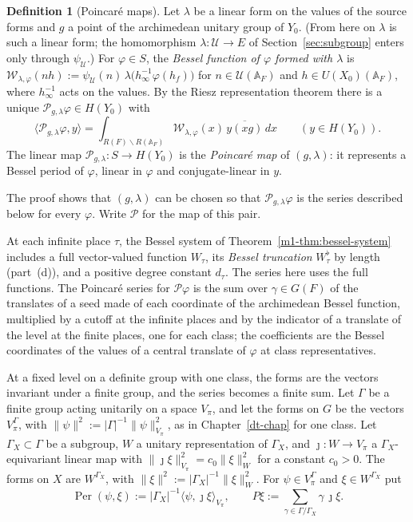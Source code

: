 \documentclass[reqno]{amsart}
\newcounter{chap}
\theoremstyle{definition}
\newtheorem{definition}{Definition}[section]
\theoremstyle{plain}
\theoremstyle{remark}
\newcommand{\A}{\mathbb A}
\newcommand{\Uc}{{\mathcal{U}}}
\newcommand{\Pc}{\mathcal P}
\newcommand{\Wc}{\mathcal W}
\newcommand{\Per}{\operatorname{Per}}
\begin{document}
\begin{definition}[Poincar\'e maps]\label{def:poincare}
Let \(\lambda\) be a linear form on the values of the source forms and \(g\) a point of the archimedean unitary group of \(Y_0\).  (From here on \(\lambda\) is such a linear form; the homomorphism \(\lambda\colon\Uc\to E\) of Section~\ref{sec:subgroup} enters only through \(\psi_{\Uc}\).)  For \(\varphi\in S\), the \emph{Bessel function of \(\varphi\) formed with \(\lambda\)} is \(\Wc_{\lambda,\varphi}(nh):=\psi_{\Uc}(n)\,\lambda\bigl(h_\infty^{-1}\varphi(h_f)\bigr)\) for \(n\in \Uc(\A_F)\) and \(h\in U(X_0)(\A_F)\), where \(h_\infty^{-1}\) acts on the values.  By the Riesz representation theorem there is a unique \(\Pc_{g,\lambda}\varphi\in H(Y_0)\) with
\[
 \langle \Pc_{g,\lambda}\varphi,y\rangle=\int_{R(F)\backslash R(\A_F)}\Wc_{\lambda,\varphi}(x)\,\overline{y(xg)}\,dx\qquad(y\in H(Y_0)).
\]
The linear map \(\Pc_{g,\lambda}\colon S\to H(Y_0)\) is the \emph{Poincar\'e map} of \((g,\lambda)\): it represents a Bessel period of \(\varphi\), linear in \(\varphi\) and conjugate-linear in \(y\).
\end{definition}

The proof shows that \((g,\lambda)\) can be chosen so that \(\Pc_{g,\lambda}\varphi\) is the series described below for every \(\varphi\).  Write \(\Pc\) for the map of this pair.

At each infinite place \(\tau\), the Bessel system of Theorem~\ref{m1-thm:bessel-system} includes a full vector-valued function \(W_\tau\), its \emph{Bessel truncation} \(W_\tau^\flat\) by length (part~(d)), and a positive degree constant \(d_\tau\).  The series here uses the full functions.  The Poincar\'e series for \(\Pc\varphi\) is the sum over \(\gamma\in G(F)\) of the translates of a seed made of each coordinate of the archimedean Bessel function, multiplied by a cutoff at the infinite places and by the indicator of a translate of the level at the finite places, one for each class; the coefficients are the Bessel coordinates of the values of a central translate of \(\varphi\) at class representatives.

At a fixed level on a definite group with one class, the forms are the vectors invariant under a finite group, and the series becomes a finite sum.  Let \(\Gamma\) be a finite group acting unitarily on a space \(V_\pi\), and let the forms on \(G\) be the vectors \(V_\pi^\Gamma\), with \(\lVert\psi\rVert^2:=\lvert\Gamma\rvert^{-1}\lVert\psi\rVert_{V_\pi}^2\), as in Chapter~\ref{dt-chap} for one class.  Let \(\Gamma_X\subset\Gamma\) be a subgroup, \(W\) a unitary representation of \(\Gamma_X\), and \(\jmath\colon W\to V_\pi\) a \(\Gamma_X\)-equivariant linear map with \(\lVert\jmath\xi\rVert_{V_\pi}^2=c_0\lVert\xi\rVert_W^2\) for a constant \(c_0>0\).  The forms on \(X\) are \(W^{\Gamma_X}\), with \(\lVert\xi\rVert^2:=\lvert\Gamma_X\rvert^{-1}\lVert\xi\rVert_W^2\).  For \(\psi\in V_\pi^\Gamma\) and \(\xi\in W^{\Gamma_X}\) put
\[
 \Per(\psi,\xi):=\lvert\Gamma_X\rvert^{-1}\langle\psi,\jmath\xi\rangle_{V_\pi},\qquad
 P\xi:=\sum_{\gamma\in\Gamma/\Gamma_X}\gamma\,\jmath\xi .
\]
\end{document}
